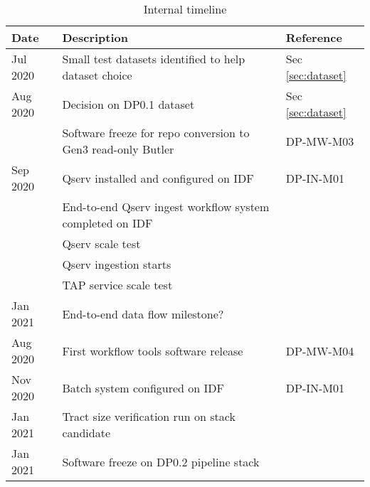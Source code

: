 \tiny \begin{longtable} {|l|l|l|} \caption{Internal timeline   \label{tab:timeline}}\\
\hline
\textbf{Date}&\textbf{Description}&\textbf{Reference}  \\ \hline

{Jul 2020}&{Small test datasets identified to help dataset choice}&{Sec \ref{sec:dataset}} \\ \hline
{Aug 2020}&{Decision on DP0.1 dataset}&{Sec \ref{sec:dataset}} \\ \hline
{}&{Software freeze for repo conversion to Gen3 read-only Butler}&{DP-MW-M03} \\ \hline
{Sep 2020}&{Qserv installed and configured on IDF}&{DP-IN-M01} \\ \hline
{}&{End-to-end Qserv ingest workflow system completed on IDF}&{} \\ \hline
{}&{Qserv scale test}&{} \\ \hline
{}&{Qserv ingestion starts}&{} \\ \hline
{}&{TAP service scale test}&{} \\ \hline
{Jan 2021}&{End-to-end data flow milestone?}&{} \\ \hline
{Aug 2020}&{First workflow tools software release}&{DP-MW-M04} \\ \hline
{Nov 2020}&{Batch system configured on IDF}&{DP-IN-M01} \\ \hline
{Jan 2021}&{Tract size verification run on stack candidate}&{} \\ \hline
{Jan 2021}&{Software freeze on DP0.2 pipeline stack}&{} \\ \hline
\end{longtable} \normalsize
